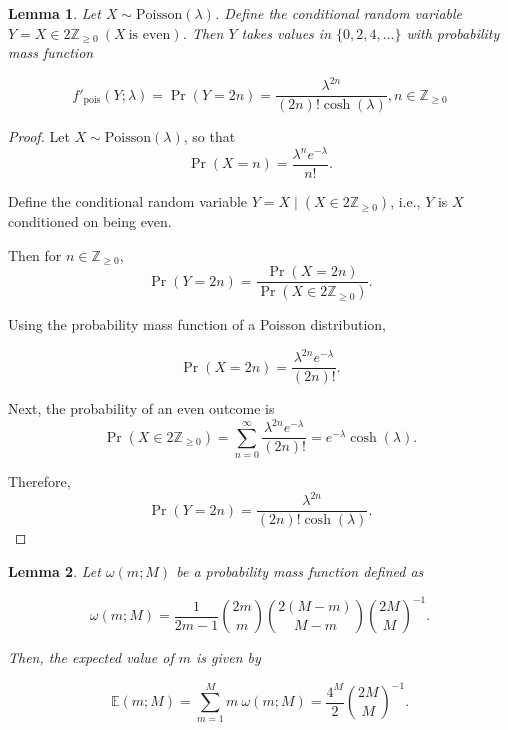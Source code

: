 \documentclass[11pt, class=article, crop=false]{standalone}
\newtheorem{lemma}{Lemma}[subsection]
\theoremstyle{definition}
\begin{document}
\begin{lemma}
\label{lemma-pois}
Let $X \sim \text{Poisson}(\lambda)$.
Define the conditional random variable $Y = X \in 2\mathbb{Z}_{\ge 0}~(X~\text{is even})$.
Then $Y$ takes values in $\{0, 2, 4,...\}$ with probability mass function

\begin{equation}
    f'_{\text{pois}}(Y;\lambda) = \Pr(Y = 2n) = \frac{\lambda^{2n}}{(2n)!\cosh(\lambda)}, n \in \mathbb{Z}_{\ge 0}
\end{equation}
\end{lemma}

\begin{proof}
Let \(X \sim \mathrm{Poisson}(\lambda)\), so that
\begin{equation}
    \Pr(X=n) = \frac{\lambda^n e^{-\lambda}}{n!}.
\end{equation}

Define the conditional random variable \(Y = X \mid (X \in 2\mathbb{Z}_{\ge 0})\), i.e., \(Y\) is \(X\) conditioned on being even.

Then for \(n \in \mathbb{Z}_{\ge 0}\),
\begin{equation}
    \Pr(Y = 2n)
    = \frac{\Pr(X=2n)}{\Pr(X \in 2\mathbb{Z}_{\ge 0})}.
\end{equation}

Using the probability mass function of a Poisson distribution,

\begin{equation}
    \Pr(X=2n) = \frac{\lambda^{2n} e^{-\lambda}}{(2n)!}.
\end{equation}

Next, the probability of an even outcome is
\begin{equation}
    \Pr(X \in 2\mathbb{Z}_{\ge 0})
    = \sum_{n=0}^{\infty} \frac{\lambda^{2n} e^{-\lambda}}{(2n)!}
    = e^{-\lambda} \cosh(\lambda).
\end{equation}

Therefore,
\begin{equation}
    \Pr(Y=2n)
    = \frac{\lambda^{2n}}{(2n)! \cosh(\lambda)}.
\end{equation}
\end{proof}

\begin{lemma}
\label{lemma-m}
Let $\omega(m; M)$ be a probability mass function defined as

\begin{equation}
    \omega(m; M) = \frac{1}{2m - 1} \binom{2m}{m} \binom{2(M - m)}{M - m} \binom{2M}{M}^{-1}.
\end{equation}

Then, the expected value of $m$ is given by

\begin{equation}
    \mathbb{E}(m; M) = \sum_{m = 1}^M m~\omega(m; M) = \frac{4^{M}}{2}\binom{2M}{M}^{-1}.
\end{equation}
\end{lemma}
\end{document}
